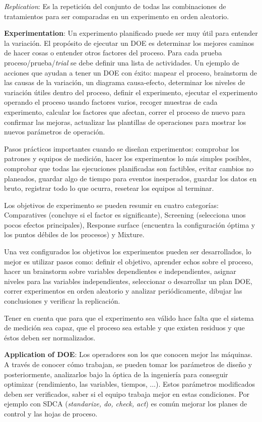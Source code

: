 \documentclass[]{article}
\begin{document}
\textit{Replication}: Es la repetición del conjunto de todas las combinaciones de tratamientos para ser comparadas en un experimento en orden aleatorio.

\textbf{Experimentation}: Un experimento planificado puede ser muy útil para entender la variación. El propósito de ejecutar un DOE es determinar los mejores caminos de hacer cosas o entender otros factores del proceso. Para cada prueba proceso/prueba/\textit{trial} se debe definir una lista de actividades. Un ejemplo de acciones que ayudan a tener un DOE con éxito: mapear el proceso, brainstorm de las causas de la variación, un diagrama causa-efecto, determinar los niveles de variación útiles dentro del proceso, definir el experimento, ejecutar el experimento operando el proceso usando factores varios, recoger muestras de cada experimento, calcular los factores que afectan, correr el proceso de nuevo para confirmar las mejoras, actualizar las plantillas de operaciones para mostrar los nuevos parámetros de operación.

Pasos prácticos importantes cuando se diseñan experimentos: comprobar los patrones y equipos de medición, hacer los experimentos lo más simples posibles, comprobar que todas las ejecuciones planificadas son factibles, evitar cambios no planeados, guardar algo de tiempo para eventos inesperados, guardar los datos en bruto, registrar todo lo que ocurra, resetear los equipos al terminar.

Los objetivos de experimento se pueden resumir en cuatro categorías: Comparatives (concluye si el factor es significante), Screening (selecciona unos pocos efectos principales), Response surface (encuentra la configuración óptima y los puntos débiles de los procesos) y Mixture.

Una vez configurados los objetivos los experimentos pueden ser desarrollados, lo mejor es utilizar pasos como: definir el objetivo, aprender echos sobre el proceso, hacer un brainstorm sobre variables dependientes e independientes, asignar niveles para las variables independientes, seleccionar o desarrollar un plan DOE, correr experimentos en orden aleatorio y analizar periódicamente, dibujar las conclusiones y verificar la replicación.

Tener en cuenta que para que el experimento sea válido hace falta que el sistema de medición sea capaz, que el proceso sea estable y que existen residuos y que éstos deben ser normalizados.

\textbf{Application of DOE}: Los operadores son los que conocen mejor las máquinas. A través de conocer cómo trabajan, se pueden tomar los parámetros de diseño y posteriormente, analizarlos bajo la óptica de la ingeniería para conseguir optimizar (rendimiento, las variables, tiempos, ...). Estos parámetros modificados deben ser verificados, saber si el equipo trabaja mejor en estas condiciones. Por ejemplo con SDCA (\textit{standarize, do, check, act}) es común mejorar los planes de control y las hojas de proceso.
\end{document}
